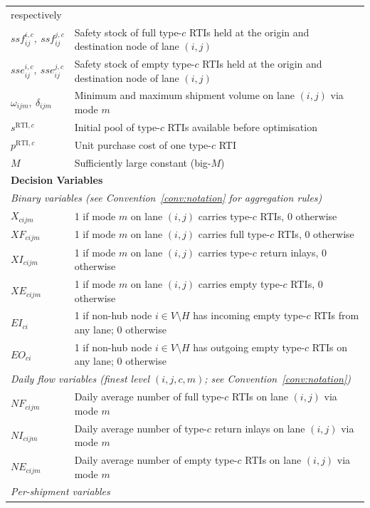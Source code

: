 \begin{longtable}{|p{}|p{}|}
    respectively \\
$ssf^{i,c}_{ij},\ ssf^{j,c}_{ij}$
  & Safety stock of full type-$c$ RTIs held at the origin and
    destination node of lane $(i,j)$ \\
$sse^{i,c}_{ij},\ sse^{j,c}_{ij}$
  & Safety stock of empty type-$c$ RTIs held at the origin and
    destination node of lane $(i,j)$ \\
$\omega_{ijm},\ \delta_{ijm}$
  & Minimum and maximum shipment volume on lane $(i,j)$
    via mode $m$ \\
$s^{\text{RTI},c}$
  & Initial pool of type-$c$ RTIs available before optimisation \\
$p^{\text{RTI},c}$
  & Unit purchase cost of one type-$c$ RTI \\
$M$
  & Sufficiently large constant (big-$M$) \\
\hline
\multicolumn{2}{|l|}{\textbf{Decision Variables}}\\ \hline
\multicolumn{2}{|l|}{\textit{Binary variables (see
    Convention~\ref{conv:notation} for aggregation rules)}}\\ \hline
$X_{cijm}$
  & 1 if mode $m$ on lane $(i,j)$ carries type-$c$ RTIs,
    0 otherwise \\
$XF_{cijm}$
  & 1 if mode $m$ on lane $(i,j)$ carries full type-$c$ RTIs,
    0 otherwise \\
$XI_{cijm}$
  & 1 if mode $m$ on lane $(i,j)$ carries type-$c$ return inlays,
    0 otherwise \\
$XE_{cijm}$
  & 1 if mode $m$ on lane $(i,j)$ carries empty type-$c$ RTIs,
    0 otherwise \\
$EI_{ci}$
  & 1 if non-hub node $i \in V \setminus H$ has incoming empty
    type-$c$ RTIs from any lane; 0 otherwise \\
$EO_{ci}$
  & 1 if non-hub node $i \in V \setminus H$ has outgoing empty
    type-$c$ RTIs on any lane; 0 otherwise \\
\hline
\multicolumn{2}{|l|}{\textit{Daily flow variables (finest level
    $(i,j,c,m)$; see Convention~\ref{conv:notation})}}\\ \hline
$NF_{cijm}$
  & Daily average number of full type-$c$ RTIs on lane $(i,j)$
    via mode $m$ \\
$NI_{cijm}$
  & Daily average number of type-$c$ return inlays on lane $(i,j)$
    via mode $m$ \\
$NE_{cijm}$
  & Daily average number of empty type-$c$ RTIs on lane $(i,j)$
    via mode $m$ \\
\hline
\multicolumn{2}{|l|}{\textit{Per-shipment variables
}}
\end{longtable}
